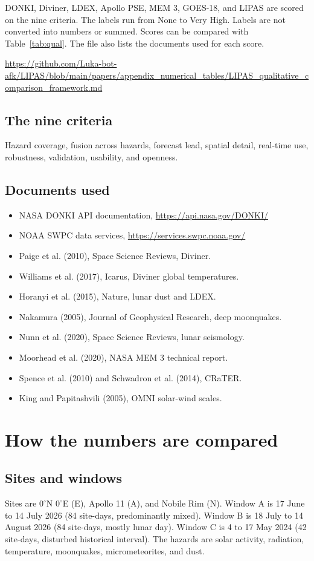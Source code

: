 DONKI, Diviner, LDEX, Apollo PSE, MEM 3, GOES-18, and LIPAS are scored on the nine criteria. The labels run from None to Very High. Labels are not converted into numbers or summed. Scores can be compared with Table~\ref{tab:qual}. The file also lists the documents used for each score.

\url{https://github.com/Luka-bot-afk/LIPAS/blob/main/papers/appendix_numerical_tables/LIPAS_qualitative_comparison_framework.md}

\subsection*{The nine criteria}
Hazard coverage, fusion across hazards, forecast lead, spatial detail, real-time use, robustness, validation, usability, and openness.

\subsection*{Documents used}
\begin{itemize}
\item NASA DONKI API documentation, \url{https://api.nasa.gov/DONKI/}
\item NOAA SWPC data services, \url{https://services.swpc.noaa.gov/}
\item Paige et al. (2010), Space Science Reviews, Diviner.
\item Williams et al. (2017), Icarus, Diviner global temperatures.
\item Horanyi et al. (2015), Nature, lunar dust and LDEX.
\item Nakamura (2005), Journal of Geophysical Research, deep moonquakes.
\item Nunn et al. (2020), Space Science Reviews, lunar seismology.
\item Moorhead et al. (2020), NASA MEM 3 technical report.
\item Spence et al. (2010) and Schwadron et al. (2014), CRaTER.
\item King and Papitashvili (2005), OMNI solar-wind scales.
\end{itemize}

\section{How the numbers are compared}

\subsection*{Sites and windows}
Sites are $0^{\circ}$N $0^{\circ}$E (E), Apollo 11 (A), and Nobile Rim (N). Window A is 17 June to 14 July 2026 (84 site-days, predominantly mixed). Window B is 18 July to 14 August 2026 (84 site-days, mostly lunar day). Window C is 4 to 17 May 2024 (42 site-days, disturbed historical interval). The hazards are solar activity, radiation, temperature, moonquakes, micrometeorites, and dust.

